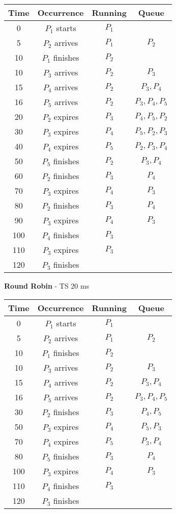 \documentclass[11pt,largemargins]{homework}
\begin{document}
\begin{tabular}{|c|c|c|c|}\hline
    \textbf{Time} & \textbf{Occurrence} & \textbf{Running} & \textbf{Queue} \\\hline
    0 & $P_1$ starts & $P_1$ & \\\hline
    5 & $P_2$ arrives & $P_1$ & $P_2$ \\\hline
    10 & $P_1$ finishes & $P_2$ & \\\hline
    10 & $P_3$ arrives & $P_2$ & $P_3$ \\\hline
    15 & $P_4$ arrives & $P_2$ & $P_3, P_4$ \\\hline
    16 & $P_5$ arrives & $P_2$ & $P_3, P_4, P_5$ \\\hline
    20 & $P_2$ expires & $P_3$ & $P_4, P_5, P_2$ \\\hline
    30 & $P_3$ expires & $P_4$ & $P_5, P_2, P_3$ \\\hline
    40 & $P_4$ expires & $P_5$ & $P_2, P_3, P_4$ \\\hline
    50 & $P_5$ finishes & $P_2$ & $P_3, P_4$ \\\hline
    60 & $P_2$ finishes & $P_3$ & $P_4$ \\\hline
    70 & $P_3$ expires & $P_4$ & $P_3$ \\\hline
    80 & $P_2$ finishes & $P_3$ & $P_4$ \\\hline
    90 & $P_3$ expires & $P_4$ & $P_3$ \\\hline
    100 & $P_4$ finishes & $P_3$ & \\\hline
    110 & $P_3$ expires & $P_3$ & \\\hline
    120 & $P_3$ finishes & & \\\hline
\end{tabular}

\textbf{Round Robin} - TS 20 ms

\begin{tabular}{|c|c|c|c|}\hline
    \textbf{Time} & \textbf{Occurrence} & \textbf{Running} & \textbf{Queue} \\\hline
    0 & $P_1$ starts & $P_1$ & \\\hline
    5 & $P_2$ arrives & $P_1$ & $P_2$ \\\hline
    10 & $P_1$ finishes & $P_2$ & \\\hline
    10 & $P_3$ arrives & $P_2$ & $P_3$ \\\hline
    15 & $P_4$ arrives & $P_2$ & $P_3, P_4$ \\\hline
    16 & $P_5$ arrives & $P_2$ & $P_3, P_4, P_5$ \\\hline
    30 & $P_2$ finishes & $P_3$ & $P_4, P_5$ \\\hline
    50 & $P_3$ expires & $P_4$ & $P_5, P_3$ \\\hline
    70 & $P_4$ expires & $P_5$ & $P_3, P_4$ \\\hline
    80 & $P_5$ finishes & $P_3$ & $P_4$ \\\hline
    100 & $P_3$ expires & $P_4$ & $P_3$ \\\hline
    110 & $P_4$ finishes & $P_3$ & \\\hline
    120 & $P_3$ finishes & & \\\hline 
\end{tabular}
\end{document}
